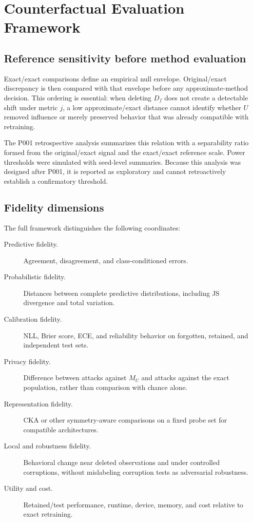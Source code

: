 \section{Counterfactual Evaluation Framework}
\subsection{Reference sensitivity before method evaluation}
Exact/exact comparisons define an empirical null envelope. Original/exact discrepancy is
then compared with that envelope before any approximate-method decision. This ordering is
essential: when deleting $D_f$ does not create a detectable shift under metric $j$, a low
approximate/exact distance cannot identify whether $U$ removed influence or merely
preserved behavior that was already compatible with retraining.

The P001 retrospective analysis summarizes this relation with a separability ratio formed
from the original/exact signal and the exact/exact reference scale. Power thresholds were
simulated with seed-level summaries. Because this analysis was designed after P001, it is
reported as exploratory and cannot retroactively establish a confirmatory threshold.

\subsection{Fidelity dimensions}
The full framework distinguishes the following coordinates:
\begin{description}
\item[Predictive fidelity.] Agreement, disagreement, and class-conditioned errors.
\item[Probabilistic fidelity.] Distances between complete predictive distributions,
including JS divergence and total variation.
\item[Calibration fidelity.] NLL, Brier score, ECE, and reliability behavior on forgotten,
retained, and independent test sets.
\item[Privacy fidelity.] Difference between attacks against $M_U$ and attacks against the
exact population, rather than comparison with chance alone.
\item[Representation fidelity.] CKA or other symmetry-aware comparisons on a fixed probe
set for compatible architectures.
\item[Local and robustness fidelity.] Behavioral change near deleted observations and under
controlled corruptions, without mislabeling corruption tests as adversarial robustness.
\item[Utility and cost.] Retained/test performance, runtime, device, memory, and cost
relative to exact retraining.
\end{description}


